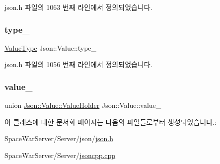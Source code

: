 json.\+h 파일의 1063 번째 라인에서 정의되었습니다.

\mbox{\label{class_json_1_1_value_abd222c2536dc88bf330dedcd076d2356}} 
\subsubsection{\texorpdfstring{type\+\_\+}{type\_}}
{\footnotesize\ttfamily \hyperlink{namespace_json_a7d654b75c16a57007925868e38212b4e}{Value\+Type} Json\+::\+Value\+::type\+\_\+\hspace{0.3cm}{\ttfamily [private]}}



json.\+h 파일의 1056 번째 라인에서 정의되었습니다.

\mbox{\label{class_json_1_1_value_aef578244546212705b9f81eb84d7e151}} 
\subsubsection{\texorpdfstring{value\+\_\+}{value\_}}
{\footnotesize\ttfamily union \hyperlink{union_json_1_1_value_1_1_value_holder}{Json\+::\+Value\+::\+Value\+Holder}  Json\+::\+Value\+::value\+\_\+\hspace{0.3cm}{\ttfamily [private]}}



이 클래스에 대한 문서화 페이지는 다음의 파일들로부터 생성되었습니다.\+:\begin{DoxyCompactItemize}
\item 
Space\+War\+Server/\+Server/json/\hyperlink{json_8h}{json.\+h}\item 
Space\+War\+Server/\+Server/\hyperlink{jsoncpp_8cpp}{jsoncpp.\+cpp}\end{DoxyCompactItemize}
